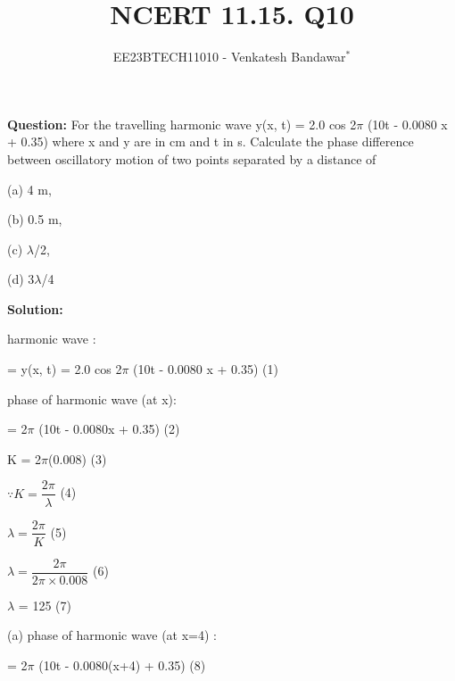 \documentclass[journal,12pt,twocolumn]{IEEEtran}
\theoremstyle{remark}
\begin{document}

\vspace{3cm}

\title{NCERT 11.15. Q10}
\author{EE23BTECH11010 - Venkatesh Bandawar$^{*}$%
}
\maketitle
\newpage
\bigskip

\renewcommand{\thefigure}{\theenumi}
\renewcommand{\thetable}{\theenumi}




\textbf{Question:} For the travelling harmonic wave
y(x, t) = 2.0 cos 2$\pi$ (10t - 0.0080 x + 0.35) where x and y are in cm and t in s. Calculate the phase difference between oscillatory
motion of two points separated by a distance of 

(a) 4 m,

(b) 0.5 m,

(c) $\lambda$/2,

(d) 3$\lambda$/4

\textbf{Solution:}  

harmonic wave :

= y(x, t) = 2.0 cos 2$\pi$ (10t - 0.0080 x + 0.35)  (1)

phase of harmonic wave (at x):

= 2$\pi$ (10t - 0.0080x + 0.35)  \hspace*{2.7cm} (2)

K = 2$\pi$(0.008)  \hspace*{5.1cm} (3)

$\because K = \dfrac{2\pi}{\lambda}$ \hspace*{6cm}  (4)

$\lambda = \dfrac{2\pi}{K}$ \hspace*{6.5cm}  (5)

\vspace{0.2cm}

$\lambda = \dfrac{2\pi}{2 \pi \times 0.008}$ \hspace{5cm}  (6)

\vspace{0.2cm}

$\lambda$ = 125 \hspace*{6.3cm}  (7)

\vspace{0.2cm}

(a) phase of harmonic wave (at x=4) :

= 2$\pi$ (10t - 0.0080(x+4) + 0.35) \hspace{2cm} (8)
\end{document}
